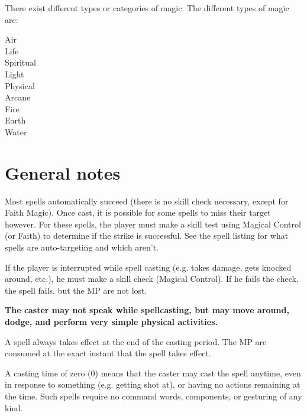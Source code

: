 \documentclass[twoside]{book}
\begin{document}
    {  
     There exist different types or categories of magic.
               The different types of magic are: 
    }
  
\begin{description}
    
  \item[ Air ] 
  \item[ Life ] 
  \item[ Spiritual ] 
  \item[ Light ] 
  \item[ Physical ] 
  \item[ Arcane ] 
  \item[ Fire ] 
  \item[ Earth ] 
  \item[ Water ] 
\end{description}
  
    

\section{General notes}
    
    {  
     Most spells automatically succeed (there is no skill
             check necessary, except for Faith Magic). Once cast, it is
             possible for some spells to miss their target however. For
             these spells, the player must make a skill test using
             Magical Control (or Faith) to determine if the strike is
             successful. See the spell listing for what spells are
             auto-targeting and which aren't. 
    }
  
    {  
     If the player is interrupted while spell casting (e.g.
            takes damage, gets knocked around, etc.), he must make a
            skill check (Magical Control). If he fails the check, the
            spell fails, but the MP are not lost.
              

 \textbf{ The caster may not speak while spellcasting, but may
               move around, dodge, and perform very simple physical
               activities. }


          
    }
  
    {  
     A spell always takes effect at the end of the casting
             period. The MP are consumed at the exact instant that the
             spell takes effect. 
    }
  
    {  
     A casting time of zero (0) means that the caster may
             cast the spell anytime, even in response to something (e.g.
             getting shot at), or having no actions remaining at the
             time. Such spells require no command words, components, or
             gesturing of any kind. 
    }
  
\end{document}
